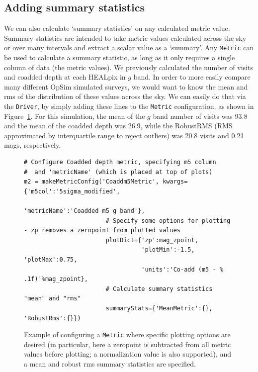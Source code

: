\documentclass[]{spie}  %
\begin{document}
\subsection{Adding summary statistics}

We can also calculate `summary statistics' on any calculated metric
value. Summary statistics are intended to take metric values
calculated across the sky or over many intervals and extract a scalar
value as a `summary'. Any {\tt Metric} can be used to calculate a summary
statistic, as long as it only requires a single column of data (the
metric values).  We previously calculated the number of visits
and coadded depth at each HEALpix in $g$ band. In order to more easily compare
many different OpSim simulated surveys, we would want to know the mean and
rms of the distribution of these values across the sky. We can easily
do that via the {\tt Driver}, by simply adding these lines to the {\tt Metric}
configuration, as shown in Figure~\ref{fig:coaddm5metric}. For this
simulation, the mean of the $g$ band number of visits was 93.8 and the
mean of the coadded depth was 26.9, while the RobustRMS (RMS
approximated by interquartile range to reject outliers) was 20.8 visits and 0.21
mags, respectively.

\begin{figure}
\centering
\begin{lstlisting}[frame=single]
# Configure Coadded depth metric, specifying m5 column 
#  and 'metricName' (which is placed at top of plots)
m2 = makeMetricConfig('Coaddm5Metric', kwargs={'m5col':'5sigma_modified',
                                               'metricName':'Coadded m5 g band'},
                       # Specify some options for plotting - zp removes a zeropoint from plotted values
                       plotDict={'zp':mag_zpoint,
                                 'plotMin':-1.5, 'plotMax':0.75,
                                 'units':'Co-add (m5 - % .1f)'%mag_zpoint},
                       # Calculate summary statistics "mean" and "rms" 
                       summaryStats={'MeanMetric':{}, 'RobustRms':{}})
\end{lstlisting}
\caption[]
{\label{fig:coaddm5metric}Example of configuring a {\tt Metric} where
  specific plotting options are desired (in particular, here a
  zeropoint is subtracted from all metric values before plotting; a
  normalization value is also supported), and a mean and robust rms summary
  statistics are specified.}
\end{figure}
\end{document}
